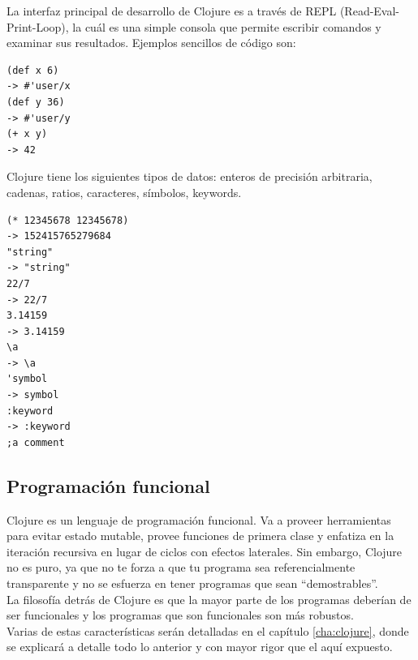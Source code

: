 La interfaz principal de desarrollo de Clojure es a través de REPL
(Read-Eval-Print-Loop), la cuál es una simple consola que permite
escribir comandos y examinar sus resultados. Ejemplos sencillos de
código son:

\begin{verbatim}
(def x 6)
-> #'user/x
(def y 36)
-> #'user/y
(+ x y)
-> 42
\end{verbatim}

Clojure tiene los siguientes tipos de datos: enteros de precisión
arbitraria, cadenas, ratios, caracteres, símbolos, keywords.

\begin{verbatim}
(* 12345678 12345678)
-> 152415765279684
"string"
-> "string"
22/7
-> 22/7
3.14159
-> 3.14159
\a
-> \a
'symbol
-> symbol
:keyword
-> :keyword
;a comment
\end{verbatim}

\subsection{Programación funcional}

Clojure es un lenguaje de programación funcional. Va a proveer
herramientas para evitar estado mutable, provee funciones de primera
clase y enfatiza en la iteración recursiva en lugar de ciclos con
efectos laterales. Sin embargo, Clojure no es puro, ya que no te forza
a que tu programa sea referencialmente transparente y no se esfuerza
en tener programas que sean ``demostrables''.\\

La filosofía detrás de Clojure es que la mayor parte de los programas
deberían de ser funcionales y los programas que son funcionales son
más robustos.\\

Varias de estas características serán detalladas en el capítulo
\ref{cha:clojure}, donde se explicará a detalle todo lo anterior y con
mayor rigor que el aquí expuesto.